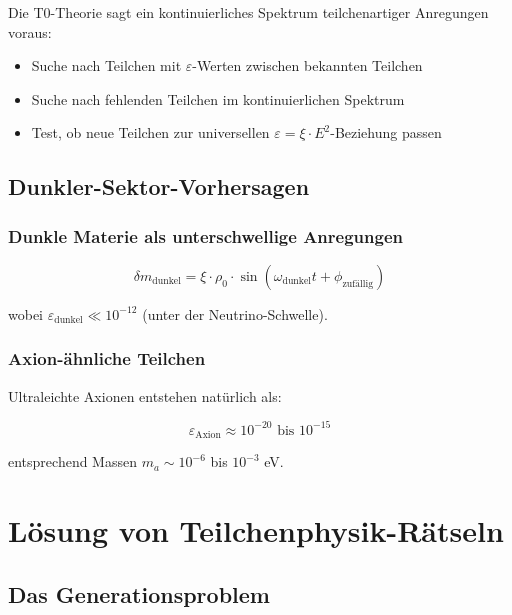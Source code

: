 \documentclass[12pt,a4paper]{article}
\newcommand{\deltam}{\delta m}
\newcommand{\xipar}{\xi}
\begin{document}
	Die T0-Theorie sagt ein kontinuierliches Spektrum teilchenartiger Anregungen voraus:
	
	\begin{itemize}
		\item Suche nach Teilchen mit $\varepsilon$-Werten zwischen bekannten Teilchen
		\item Suche nach fehlenden Teilchen im kontinuierlichen Spektrum
		\item Test, ob neue Teilchen zur universellen $\varepsilon = \xipar \cdot E^2$-Beziehung passen
	\end{itemize}
	
	\subsection{Dunkler-Sektor-Vorhersagen}
	
	\subsubsection{Dunkle Materie als unterschwellige Anregungen}
	
	\begin{equation}
		\deltam_{\text{dunkel}} = \xipar \cdot \rho_0 \cdot \sin(\omega_{\text{dunkel}} t + \phi_{\text{zufällig}})
		\label{eq:dark_matter_field}
	\end{equation}
	
	wobei $\varepsilon_{\text{dunkel}} \ll 10^{-12}$ (unter der Neutrino-Schwelle).
	
	\subsubsection{Axion-ähnliche Teilchen}
	
	Ultraleichte Axionen entstehen natürlich als:
	
	\begin{equation}
		\varepsilon_{\text{Axion}} \approx 10^{-20} \text{ bis } 10^{-15}
		\label{eq:axion_epsilon}
	\end{equation}
	
	entsprechend Massen $m_a \sim 10^{-6}$ bis $10^{-3}$ eV.
	
	\section{Lösung von Teilchenphysik-Rätseln}
	
	\subsection{Das Generationsproblem}
	
\end{document}
